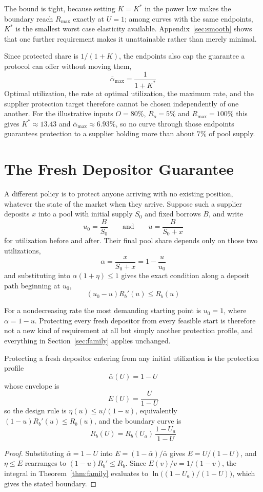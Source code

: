 \documentclass[11pt,a4paper]{article}
\begin{document}
The bound is tight, because setting $K=K^*$ in the power law makes the boundary reach $R_{\max}$ exactly at $U=1$; among curves with the same endpoints, $K^*$ is the smallest worst case elasticity available. Appendix~\ref{sec:smooth} shows that one further requirement makes it unattainable rather than merely minimal.

Since protected share is $1/(1+K)$, the endpoints also cap the guarantee a protocol can offer without moving them,
\[
\boxed{
\bar\alpha_{\max}=\frac{1}{1+K^*}
}
\]
Optimal utilization, the rate at optimal utilization, the maximum rate, and the supplier protection target therefore cannot be chosen independently of one another. For the illustrative inputs $O=80\%$, $R_o=5\%$ and $R_{\max}=100\%$ this gives $K^*\approx13.43$ and $\bar\alpha_{\max}\approx6.93\%$, so no curve through those endpoints guarantees protection to a supplier holding more than about $7\%$ of pool supply.

\section{The Fresh Depositor Guarantee}
\label{sec:fresh}

A different policy is to protect anyone arriving with no existing position, whatever the state of the market when they arrive. Suppose such a supplier deposits $x$ into a pool with initial supply $S_0$ and fixed borrows $B$, and write
\[
u_0=\frac{B}{S_0}
\qquad\text{and}\qquad
u=\frac{B}{S_0+x}
\]
for utilization before and after. Their final pool share depends only on those two utilizations,
\[
\alpha=\frac{x}{S_0+x}=1-\frac{u}{u_0}
\]
and substituting into $\alpha(1+\eta)\leq1$ gives the exact condition along a deposit path beginning at $u_0$,
\[
\boxed{(u_0-u)R_b'(u)\leq R_b(u)}
\]

For a nondecreasing rate the most demanding starting point is $u_0=1$, where $\alpha=1-u$. Protecting every fresh depositor from every feasible start is therefore not a new kind of requirement at all but simply another protection profile, and everything in Section~\ref{sec:family} applies unchanged.

\begin{theorem}
\label{thm:fresh}
Protecting a fresh depositor entering from any initial utilization is the protection profile
\[
\boxed{\bar\alpha(U)=1-U}
\]
whose envelope is
\[
\boxed{E(U)=\frac{U}{1-U}}
\]
so the design rule is $\eta(u)\leq u/(1-u)$, equivalently $(1-u)R_b'(u)\leq R_b(u)$, and the boundary curve is
\[
\boxed{
R_b(U)=R_b(U_a)\,\frac{1-U_a}{1-U}
}
\]
\end{theorem}
\begin{proof}
Substituting $\bar\alpha=1-U$ into $E=(1-\bar\alpha)/\bar\alpha$ gives $E=U/(1-U)$, and $\eta\leq E$ rearranges to $(1-u)R_b'\leq R_b$. Since $E(v)/v=1/(1-v)$, the integral in Theorem~\ref{thm:family} evaluates to $\ln\big((1-U_a)/(1-U)\big)$, which gives the stated boundary.
\end{proof}
\end{document}

